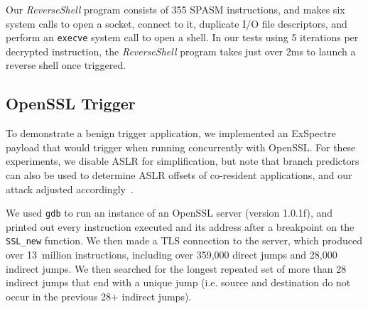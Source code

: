 

Our \textit{ReverseShell} program consists of 355 SPASM instructions, and
makes six system calls to open a socket,
connect to it, duplicate I/O file descriptors, and perform an \texttt{execve}
system call to open a shell.
In our tests using 5 iterations per decrypted instruction, the
\textit{ReverseShell} program takes just over 2ms to launch a reverse shell
once triggered.


\FigSpasmModel

\subsection{OpenSSL Trigger}
\label{subsec:openssl-impl}


To demonstrate a benign trigger application, we implemented an ExSpectre payload that
would trigger when running concurrently with OpenSSL.
For these experiments, we disable
ASLR for simplification, but note that
branch predictors can also be used to determine ASLR offsets of co-resident applications,
and our attack adjusted accordingly~\cite{evtyushkin2016jump}.

We used \texttt{gdb} to run an instance of an OpenSSL server (version 1.0.1f),
and printed out every instruction executed and its address after a breakpoint on
the \texttt{SSL\_new} function. We then made a TLS connection to the
server,
which produced over 13~million instructions, including over 359,000 direct jumps
and 28,000 indirect jumps. We then searched for the longest repeated set of more than
28 indirect jumps that end with a unique jump (i.e. source and destination do
not occur in the previous 28+ indirect jumps).

